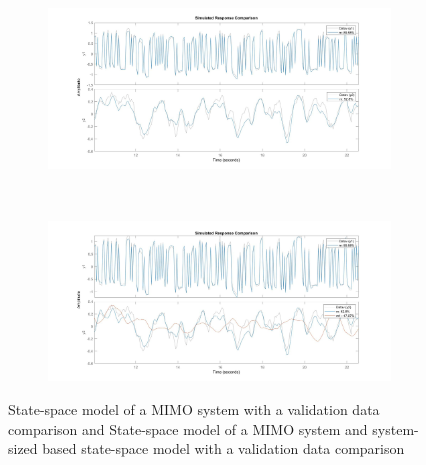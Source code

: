 \documentclass[journal,twoside,web]{ieeecolor}
\begin{document}
\begin{figure}[htbp]
  \centering
  \begin{subfigure}[b]{\linewidth}
    \includegraphics[height=4.25cm]{figs/img/example2Fig1}
    \caption{}
    \label{fig:ex2fig1}
  \end{subfigure}
  \\
  \begin{subfigure}[b]{\linewidth}
    \includegraphics[height=4.25cm]{figs/img/example2Fig2}
    \caption{}
    \label{fig:ex2fig2}
  \end{subfigure}
  \caption{ State-space model of a MIMO system with a validation data comparison and  State-space model of a MIMO system and system-sized based state-space model with a validation data comparison }
  \label{fig:ex2}
\end{figure}
\end{document}
